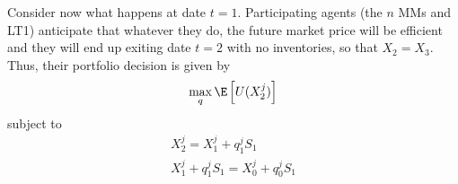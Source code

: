 \documentclass[11pt]{article}
\begin{document}
Consider now what happens at date \(t=1\). Participating agents (the \(n\) MMs and LT1) anticipate
that whatever they do, the future market price will be efficient and they will end up exiting date
\(t=2\) with no inventories, so that \(X_2=X_3\). Thus, their portfolio decision is given by
\begin{equation*}
\max_q\E\left[ U(X_2^j) \right]
\end{equation*}
subject to
\begin{gather*}
X_2^j=X_1^j+q_1^jS_1\\
X_1^j+q_1^jS_1=X_0^j+q_0^jS_1
\end{gather*}
\end{document}

